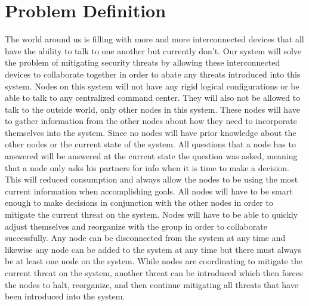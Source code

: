 \documentclass[draftclsnofoot, onecolumn, 10pt]{IEEEtran}
\begin{document}
\section*{Problem Definition}
The world around us is filling with more and more interconnected devices that all have the ability to talk to one another but currently don't. Our system will solve the problem of mitigating security threats by allowing these interconnected devices to collaborate together in order to abate any threats introduced into this system. Nodes on this system will not have any rigid logical configurations or be able to talk to any centralized command center. They will also not be allowed to talk to the outside world, only other nodes in this system. These nodes will have to gather information from the other nodes about how they need to incorporate themselves into the system. Since no nodes will have prior knowledge about the other nodes or the current state of the system. All questions that a node has to answered will be answered at the current state the question was asked, meaning that a node only asks his partners for info when it is time to make a decision. This will reduced consumption and always allow the nodes to be using the most current information when accomplishing goals. All nodes will have to be smart enough to make decisions in conjunction with the other nodes in order to mitigate the current threat on the system. Nodes will have to be able to quickly adjust themselves and reorganize with the group in order to collaborate successfully. Any node can be disconnected from the system at any time and likewise any node can be added to the system at any time but there must always be at least one node on the system. While nodes are coordinating to mitigate the current threat on the system, another threat can be introduced which then forces the nodes to halt, reorganize, and then continue mitigating all threats that have been introduced into the system. 


\vspace{0.0 in}
\end{document}
